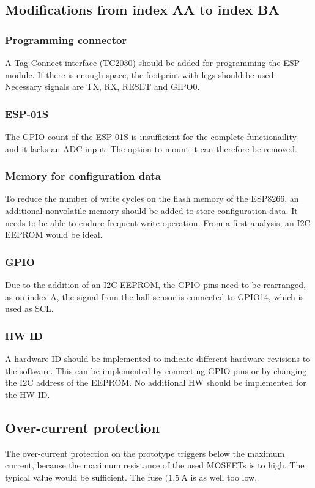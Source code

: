 \subsection{Modifications from index AA to index BA}

\subsubsection{Programming connector}
A Tag-Connect interface (TC2030) should be added for programming the ESP module. If there is enough space, the footprint with legs should be used. Necessary signals are TX, RX, RESET and GIPO0. 

\subsubsection{ESP-01S}
The GPIO count of the ESP-01S is insufficient for the complete functionaility and it lacks an \ac{ADC} input. The option to mount it can therefore be removed. 

\subsubsection{Memory for configuration data}
To reduce the number of write cycles on the flash memory of the ESP8266, an additional nonvolatile memory should be added to store configuration data. It needs to be able to endure frequent write operation. From a first analysis, an \ac{I2C} \ac{EEPROM} would be ideal. 

\subsubsection{GPIO}
Due to the addition of an \ac{I2C} \ac{EEPROM}, the \ac{GPIO} pins need to be rearranged, as on index A, the signal from the hall sensor is connected to GPIO14, which is used as SCL. 

\subsubsection{HW ID}
A hardware ID should be implemented to indicate different hardware revisions to the software. This can be implemented by connecting GPIO pins or by changing the I2C address of the EEPROM. No additional HW should be implemented for the HW ID. 

\subsection{Over-current protection}
The over-current protection on the prototype triggers below the maximum current, because the maximum resistance of the used MOSFETs is to high. The typical value would be sufficient. The fuse $(\qty{1.5}{\A}$ is as well too low. 


